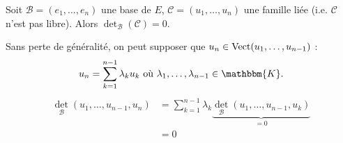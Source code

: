 \begin{thm}
	Soit $\mathcal{B} = (e_1, \ldots, e_n)$ une base de $E$, $\mathcal{C} = (u_1, \ldots, u_n)$ une famille liée (i.e. $\mathcal{C}$ n'est pas libre). Alors $\det_\mathcal{B}(\mathcal{C}) = 0$.
\end{thm}

\begin{prv}
	Sans perte de généralité, on peut supposer que $u_n \in \operatorname{Vect}(u_1, \ldots, u_{n-1})$ : \[
		u_n = \sum_{k=1}^{n-1} \lambda_k u_k \text{ où } \lambda_1, \ldots, \lambda_{n-1} \in \mathbbm{K}.
	\]
	\begin{align*}
		\det_\mathcal{B}(u_1, \ldots, u_{n-1}, u_n) &= \sum_{k=1}^{n-1} \lambda_k \underbrace{\det_{\mathcal{B}}(u_1, \ldots, u_{n-1}, u_k)}_{=0} \\
			&= 0 \\
	\end{align*}
\end{prv}
